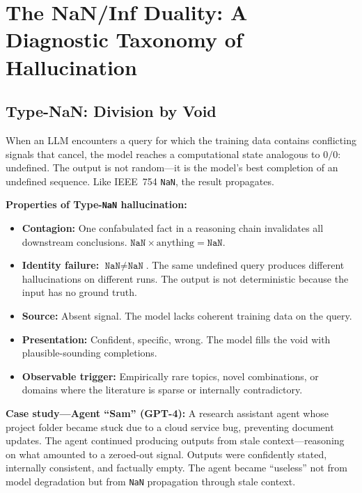 \documentclass[11pt]{article}
\theoremstyle{definition}
\theoremstyle{remark}
\newcommand{\NaN}{\texttt{NaN}}
\begin{document}
\section{The NaN/Inf Duality: A Diagnostic Taxonomy of Hallucination}
\label{sec:taxonomy}

\subsection{Type-NaN: Division by Void}
\label{sec:type-nan}

When an LLM encounters a query for which the training data contains conflicting
signals that cancel, the model reaches a computational state analogous to $0/0$:
undefined.  The output is not random---it is the model's best completion of an
undefined sequence.  Like IEEE~754 \NaN{}, the result propagates.

\medskip
\noindent\textbf{Properties of Type-\NaN{} hallucination:}
\begin{itemize}
  \item \textbf{Contagion:} One confabulated fact in a reasoning chain invalidates
    all downstream conclusions.  $\NaN \times \mathrm{anything} = \NaN$.
  \item \textbf{Identity failure:} $\NaN \neq \NaN$.  The same undefined query
    produces different hallucinations on different runs.  The output is not
    deterministic because the input has no ground truth.
  \item \textbf{Source:} Absent signal.  The model lacks coherent training data on
    the query.
  \item \textbf{Presentation:} Confident, specific, wrong.  The model fills the
    void with plausible-sounding completions.
  \item \textbf{Observable trigger:} Empirically rare topics, novel combinations,
    or domains where the literature is sparse or internally contradictory.
\end{itemize}

\medskip
\noindent\textbf{Case study---Agent ``Sam'' (GPT-4):}  A research assistant agent
whose project folder became stuck due to a cloud service bug, preventing document
updates.  The agent continued producing outputs from stale context---reasoning on
what amounted to a zeroed-out signal.  Outputs were confidently stated, internally
consistent, and factually empty.  The agent became ``useless'' not from model
degradation but from \NaN{} propagation through stale context.
\end{document}
